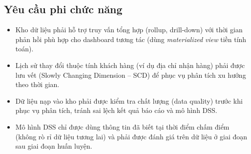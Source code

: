 \subsection{Yêu cầu phi chức năng}
\begin{itemize}
    \item Kho dữ liệu phải hỗ trợ truy vấn tổng hợp (rollup, drill-down) với thời gian phản
          hồi phù hợp cho dashboard tương tác (dùng \textit{materialized view} tiền tính toán).
    \item Lịch sử thay đổi thuộc tính khách hàng (ví dụ địa chỉ nhận hàng) phải được lưu vết
          (Slowly Changing Dimension -- SCD) để phục vụ phân tích xu hướng theo thời gian.
    \item Dữ liệu nạp vào kho phải được kiểm tra chất lượng (data quality) trước khi phục vụ
          phân tích, tránh sai lệch kết quả báo cáo và mô hình DSS.
    \item Mô hình DSS chỉ được dùng thông tin đã biết tại thời điểm chấm điểm (không rò rỉ dữ
          liệu tương lai) và phải được đánh giá trên dữ liệu ở giai đoạn sau giai đoạn huấn luyện.
\end{itemize}
